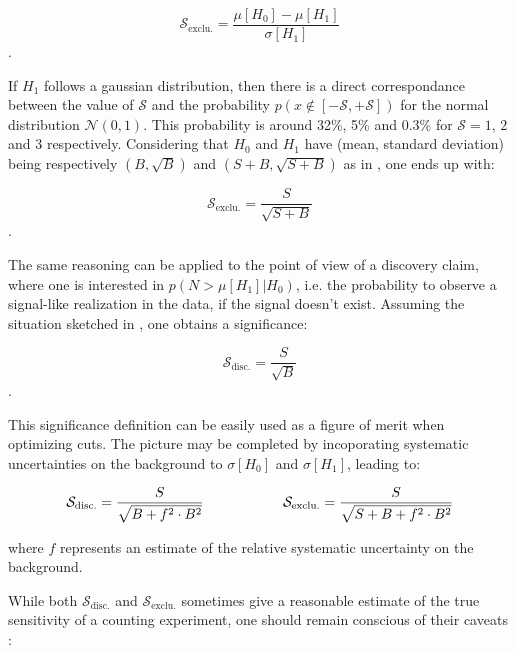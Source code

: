     $$ \mathcal{S}_\text{exclu.} = \frac{\mu[H_0] - \mu[H_1]}{\sigma[H_1]}$$.

    If $H_1$ follows a gaussian distribution, then there is a direct correspondance
    between the value of $\mathcal{S}$ and the probability $p(x \notin [-\mathcal{S},+\mathcal{S}])$
    for the normal distribution $\mathcal{N(0,1)}$. This probability is around 32\%,
    5\% and 0.3\% for $\mathcal{S} = 1$, $2$ and $3$ respectively.
    Considering that $H_0$ and $H_1$ have (mean, standard deviation) being respectively
    $(B,\sqrt{B})$ and $(S+B,\sqrt{S+B})$ as in , one ends up
    with:

    $$ \mathcal{S}_\text{exclu.} = \frac{S}{\sqrt{S+B}}$$.

    The same reasoning can be applied to the point of view of a discovery claim, where
    one is interested in $p(N > \mu[H_1]|H_0)$, i.e. the probability to observe a
    signal-like realization in the data, if the signal doesn't exist. Assuming the situation
    sketched in , one obtains a significance:

    $$ \mathcal{S}_\text{disc.} = \frac{S}{\sqrt{B}}$$.

    This significance definition can be easily used as a figure of merit when optimizing
    cuts. The picture may be completed by incoporating systematic uncertainties on the
    background to $\sigma[H_0]$ and $\sigma[H_1]$, leading to:

    \begin{equation}
       \mathcal{S}_\text{disc.} = \frac{S}{\sqrt{B+f^2 \cdot B^2}}
       \hspace*{2cm}
       \mathcal{S}_\text{exclu.} = \frac{S}{\sqrt{S+B+f^2 \cdot B^2}}
       \label{FoM}
   \end{equation}

    where $f$ represents an estimate of the relative systematic uncertainty on the background.

    While both $\mathcal{S}_\text{disc.}$ and $\mathcal{S}_\text{exclu.}$ sometimes give a reasonable estimate of the true
    sensitivity of a counting experiment, one should remain conscious of their caveats \cite{Punzi}:

